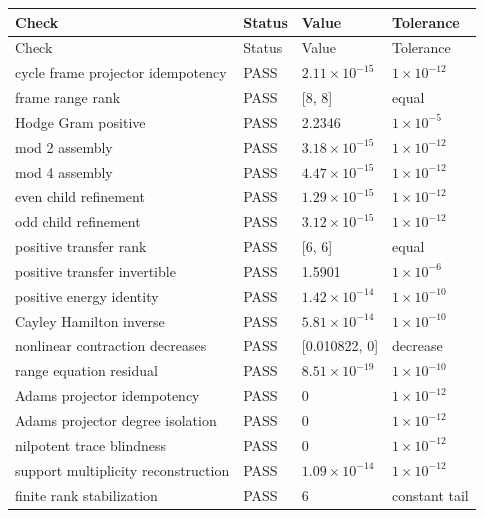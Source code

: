 {\small
\begin{longtable}{p{}p{}p{}p{}}
\toprule
Check & Status & Value & Tolerance \\
\midrule
\endfirsthead
\toprule
Check & Status & Value & Tolerance \\
\midrule
\endhead
cycle frame projector idempotency & PASS & $2.11\times10^{-15}$ & $1\times10^{-12}$ \\
frame range rank & PASS & [8, 8] & equal \\
Hodge Gram positive & PASS & 2.2346 & $1\times10^{-5}$ \\
mod 2 assembly & PASS & $3.18\times10^{-15}$ & $1\times10^{-12}$ \\
mod 4 assembly & PASS & $4.47\times10^{-15}$ & $1\times10^{-12}$ \\
even child refinement & PASS & $1.29\times10^{-15}$ & $1\times10^{-12}$ \\
odd child refinement & PASS & $3.12\times10^{-15}$ & $1\times10^{-12}$ \\
positive transfer rank & PASS & [6, 6] & equal \\
positive transfer invertible & PASS & 1.5901 & $1\times10^{-6}$ \\
positive energy identity & PASS & $1.42\times10^{-14}$ & $1\times10^{-10}$ \\
Cayley Hamilton inverse & PASS & $5.81\times10^{-14}$ & $1\times10^{-10}$ \\
nonlinear contraction decreases & PASS & [0.010822, 0] & decrease \\
range equation residual & PASS & $8.51\times10^{-19}$ & $1\times10^{-10}$ \\
Adams projector idempotency & PASS & 0 & $1\times10^{-12}$ \\
Adams projector degree isolation & PASS & 0 & $1\times10^{-12}$ \\
nilpotent trace blindness & PASS & 0 & $1\times10^{-12}$ \\
support multiplicity reconstruction & PASS & $1.09\times10^{-14}$ & $1\times10^{-12}$ \\
finite rank stabilization & PASS & 6 & constant tail \\
\bottomrule
\end{longtable}
}
